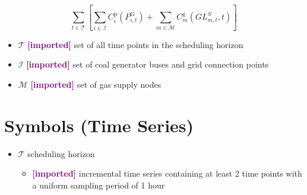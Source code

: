 \documentclass{article}
\newcommand{\imported}{\textcolor{purple}{\textbf{[imported] }}}
\def\sT{\mathcal T}
\def\sM{\mathcal M}
\def\sI{\mathcal I}
\begin{document}
\begin{equation*}
  \sum_{t \in \sT} \left[ \sum_{i \in \sI} C^{\text{p}}_i (P^{\text{G}}_{i,t}) +
    \sum_{m \in \sM} C^{\text{g}}_m (GL^S_{m,t}, t) \right]
\end{equation*}
\begin{itemize}
\item $\sT$ \imported set of all time points in the scheduling horizon
\item $\sI$ \imported set of coal generator buses and grid connection points
\item $\sM$ \imported set of gas supply nodes
\end{itemize}




\section{Symbols (Time Series)}
\begin{itemize}
\item $\sT$ scheduling horizon
  \begin{itemize}
  \item \imported incremental time series containing at least 2 time points with
    a uniform sampling period of 1 hour
  \end{itemize}
\end{itemize}
\end{document}
